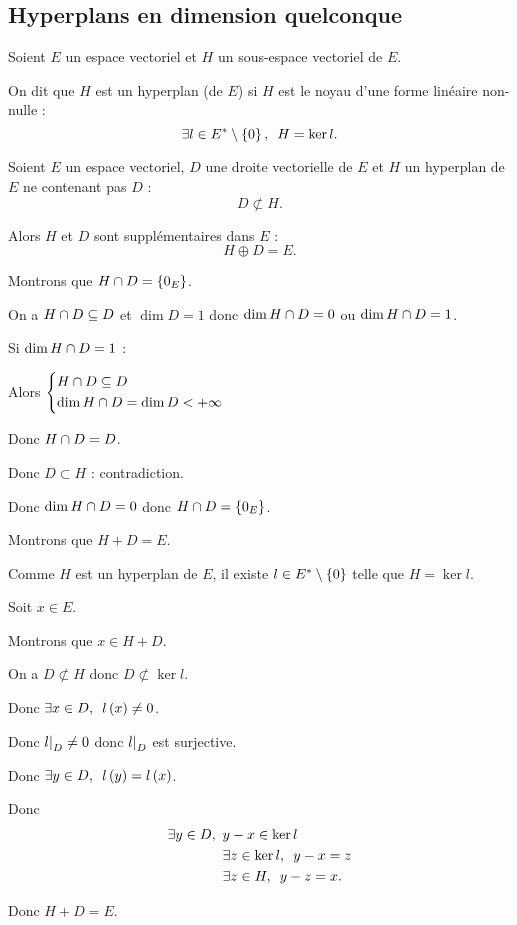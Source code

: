 \subsection{Hyperplans en dimension quelconque}

\begin{defi}
Soient \(E\) un espace vectoriel et \(H\) un sous-espace vectoriel de \(E\).

On dit que \(H\) est un hyperplan (de \(E\)) si \(H\) est le noyau d'une forme linéaire non-nulle : \[\quantifs{\exists l\in E\etoile\excluant\accol{0}}H=\ker l.\]
\end{defi}

\begin{prop}
Soient \(E\) un espace vectoriel, \(D\) une droite vectorielle de \(E\) et \(H\) un hyperplan de \(E\) ne contenant pas \(D\) : \[D\not\subset H.\]

Alors \(H\) et \(D\) sont supplémentaires dans \(E\) : \[H\oplus D=E.\]
\end{prop}

\begin{dem}
Montrons que \(H\cap D=\left\lbrace0_E\right\rbrace\).

On a \(H\cap D\subseteq D\) et \(\dim D=1\) donc \(\dim H\cap D=0\) ou \(\dim H\cap D=1\).

Si \(\dim H\cap D=1\) :

Alors \(\begin{dcases}
H\cap D\subseteq D \\
\dim H\cap D=\dim D<+\infty
\end{dcases}\)

Donc \(H\cap D=D\).

Donc \(D\subset H\) : contradiction.

Donc \(\dim H\cap D=0\) donc \(H\cap D=\left\lbrace0_E\right\rbrace\).

Montrons que \(H+D=E\).

Comme \(H\) est un hyperplan de \(E\), il existe \(l\in E^{*}\setminus\left\lbrace0\right\rbrace\) telle que \(H=\ker l\).

Soit \(x\in E\).

Montrons que \(x\in H+D\).

On a \(D\not\subset H\) donc \(D\not\subset\ker l\).

Donc \(\quantifs{\exists x\in D}l\paren{x}\not=0\).

Donc \(\restr{l}{D}\not=0\) donc \(\restr{l}{D}\) est surjective.

Donc \(\quantifs{\exists y\in D}l\paren{y}=l\paren{x}\).

Donc \[\begin{aligned}
\quantifs{\exists y\in D}&y-x\in\ker l \\
&\quantifs{\exists z\in\ker l}y-x=z \\
&\quantifs{\exists z\in H}y-z=x.
\end{aligned}\]

Donc \(H+D=E\).
\end{dem}

